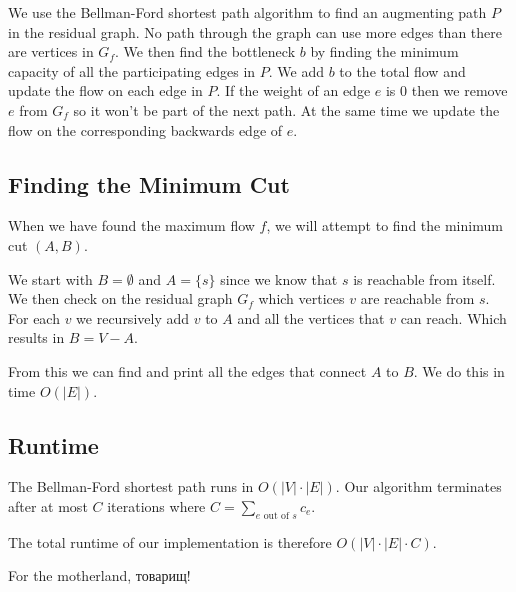 \documentclass{tufte-handout}
\begin{document}
	We use the Bellman-Ford shortest path algorithm to find an augmenting path $P$ in the residual graph. 
	No path through the graph can use more edges than there are vertices in $G_f$.
	We then find the bottleneck $b$ by finding the minimum capacity of all the participating edges in $P$.
	We add $b$ to the total flow and update the flow on each edge in $P$.
	If the weight of an edge $e$ is $0$ then we remove $e$ from $G_f$ so it won't be part of the next path. At the same time we update the flow on the corresponding backwards edge of $e$.
	
	\subsection{Finding the Minimum Cut}
	When we have found the maximum flow $f$, we will attempt to find the minimum cut $(A, B)$.
	
	We start with $B = \emptyset$ and $A = \{ s \}$ since we know that $s$ is reachable from itself. 
	We then check on the residual graph $G_f$ which vertices $v$ are reachable from $s$. For each $v$ we recursively add $v$ to $A$ and all the vertices that $v$ can reach. Which results in $B = V-A$.
	
	From this we can find and print all the edges that connect $A$ to $B$. We do this in time $O(|E|)$.
  
  
  \subsection{Runtime}
  The Bellman-Ford shortest path runs in $O(|V|\cdot|E|)$. Our algorithm terminates after at most $C$ iterations where $C = \sum_{e \text{ out of } s}c_e$.
  
  The total runtime of our implementation is therefore $O(|V|\cdot|E|\cdot C)$.
  
  \bigskip
  \noindent
  For the motherland, \foreignlanguage{russian}{товарищ}!
  
\end{document}
